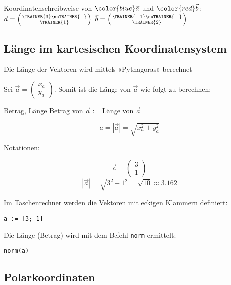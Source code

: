 
\vspace{5mm}

Koordinatenschreibweise von $\color{blue}\vec{a}$ und $\color{red}\vec{b}$:\,\,
$\vec{a} = \left( \TRAINER{3}\noTRAINER{\,\,\,\,} \atop \TRAINER{1} \right)$
$\vec{b} = \left( \TRAINER{-1}\noTRAINER{\,\,\,\,\,} \atop \TRAINER{2} \right)$
\newpage




\subsection{Länge im kartesischen Koordinatensystem}

Die Länge der Vektoren wird mittels «Pythagoras» berechnet

Sei $\vec{a}  = \begin{pmatrix}x_a\\y_a\end{pmatrix}$. Somit ist die Länge von
    $\vec{a}$ wie folgt zu berechnen:

    \begin{gesetz}{Betrag, Länge}{}
      Betrag von $\vec{a}$ := Länge von $\vec{a}$

      $$a = |\vec{a}| = \sqrt{x_a^2 + y_a^2}$$
      \end{gesetz}
    Notationen:

    \begin{beispiel}{}{}
      $$ \vec{a}= \begin{pmatrix} 3\\ 1\end{pmatrix}$$
        $$|\vec{a}| = \sqrt{3^2+1^2} = \sqrt{10}\approx 3.162$$
      \end{beispiel}
    

    \begin{bemerkung}{}{}
      Im Taschenrechner werden die Vektoren mit eckigen Klammern
      definiert:

      \texttt{a := [3; 1]}

      Die Länge (Betrag) wird mit dem Befehl \texttt{norm} ermittelt:

      \texttt{norm(a)}
    \end{bemerkung}
\newpage



\subsection{Polarkoordinaten}

